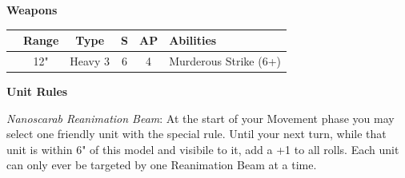 \begin{minipage}[t]{0.72\textwidth}
	
	\vspace*{2em}
	\textbf{Weapons}
	
	\begin{tabular}{m{95 pt} *{4}{c} >{\raggedright\arraybackslash}p{130pt}}
		& Range & Type & S & AP & Abilities \\
		\hline
		\quickref{Atomiser Beam Lance} & 12" & Heavy 3 & 6 & 4 & Murderous Strike (6+) \\
	\end{tabular}

	\vspace*{2em}
	\textbf{Unit Rules}
	
	\textit{Nanoscarab Reanimation Beam}: At the start of your Movement phase you may select one friendly unit with the  special rule. Until your next turn, while that unit is within 6" of this model and visibile to it, add a +1 to all  rolls. Each unit can only ever be targeted by one Reanimation Beam at a time.
\end{minipage}



\newpage
\subsubsection[Cryptek Conclave]{}

